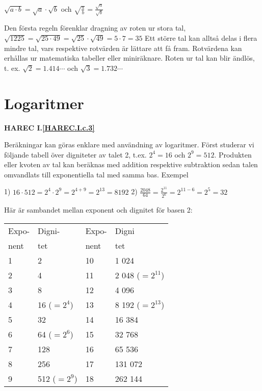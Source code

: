 \(\sqrt{a \cdot b} = \sqrt{a} \cdot \sqrt{b}\) och
\(\sqrt{\frac{a}{b}} = \frac{\sqrt{a}}{\sqrt{b}}\)

Den första regeln förenklar dragning av roten ur stora tal,
\(\sqrt{1225} = \sqrt{25 \cdot 49} = \sqrt{25} \cdot \sqrt{49} = 5 \cdot 7 = 35\)
Ett större tal kan alltså delas i flera mindre tal, vars respektive rotvärden är
lättare att få fram. Rotvärdena kan erhållas ur matematiska tabeller eller
miniräknare.
Roten ur tal kan blir ändlös, t. ex.
\(\sqrt{2} = 1.414\cdots\) och \(\sqrt{3} = 1.732\cdots\)

\section{Logaritmer}
\textbf{HAREC I.\ref{HAREC.I.c.3}\label{myHAREC.I.c.3}}

Beräkningar kan göras enklare med användning av logaritmer.
Först studerar vi följande tabell över digniteter av talet 2,
t.ex. \(2^4 = 16\) och \(2^9 = 512\).
Produkten eller kvoten av tal kan beräknas med addition respektive subtraktion
sedan talen omvandlats till exponentiella tal med samma bas.
Exempel

1) \(16 \cdot 512 = 2^4 \cdot 2^9 =2^{4+9} = 2^{13} = 8192\)
2) \(\frac{2048}{64} = \frac{2^{11}}{2^6} =2^{11-6} =2^5 = 32\)

Här är sambandet mellan exponent och dignitet för basen 2:

\begin{tabular}{ll|ll}
Expo- & Digni-       & Expo- & Digni            \\
nent  & tet          & nent  & tet              \\ \hline
1     & 2            & 10    & 1 024            \\
2     & 4            & 11    & 2 048 (\(=2^{11}\)) \\
3     & 8            & 12    & 4 096            \\
4     & 16 (\(=2^4\))  & 13    & 8 192 (\(=2^{13}\)) \\
5     & 32           & 14    & 16 384           \\
6     & 64 (\(=2^6\))  & 15    & 32 768           \\
7     & 128          & 16    & 65 536           \\
8     & 256          & 17    & 131 072          \\
9     & 512 (\(=2^9\)) & 18    & 262 144
\end{tabular}

